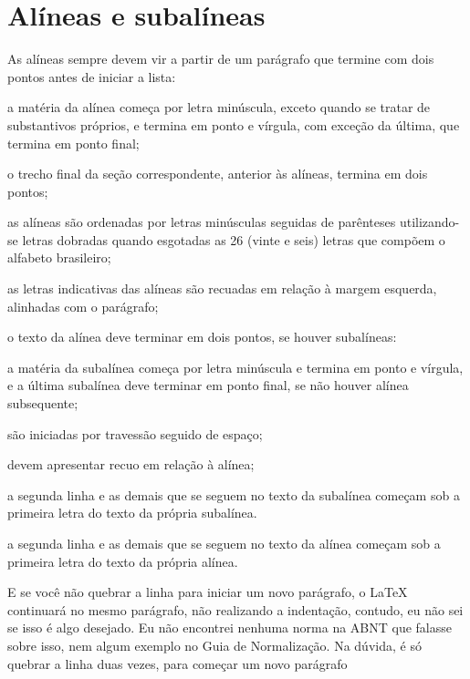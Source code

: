 \section{Alíneas e subalíneas}
  As alíneas sempre devem vir a partir de um parágrafo que termine com dois pontos antes de iniciar a lista:
  \begin{alinea}
    \item a matéria da alínea começa por letra minúscula, exceto quando se tratar de substantivos próprios, e termina em ponto e vírgula, com exceção da última, que termina em ponto final;
    \item o trecho final da seção correspondente, anterior às alíneas, termina em
    dois pontos;
    \item as alíneas são ordenadas por letras minúsculas seguidas de parênteses utilizando-se letras dobradas quando esgotadas as 26 (vinte e seis) letras que compõem o alfabeto brasileiro;\label{alinea:exemplo-ref}
    \item as letras indicativas das alíneas são recuadas em relação à margem
    esquerda, alinhadas com o parágrafo;
    \item o texto da alínea deve terminar em dois pontos, se houver subalíneas: 
    \begin{subalinea}
      \item a matéria da subalínea começa por letra minúscula e termina em ponto e
      vírgula, e a última subalínea deve terminar em ponto final, se não houver
      alínea subsequente; 
      \item são iniciadas por travessão seguido de espaço;
      \item devem apresentar recuo em relação à alínea;
      \item a segunda linha e as demais que se seguem no texto da subalínea
      começam sob a primeira letra do texto da própria subalínea.
    \end{subalinea}
    \item a segunda linha e as demais que se seguem no texto da alínea começam
    sob a primeira letra do texto da própria alínea.
  \end{alinea}
E se você não quebrar a linha para iniciar um novo parágrafo, o \LaTeX{} continuará no mesmo parágrafo, não realizando a indentação, contudo, eu não sei se isso é algo desejado. Eu não encontrei nenhuma norma na ABNT que falasse sobre isso, nem algum exemplo no Guia de Normalização. Na dúvida, é só quebrar a linha duas vezes, para começar um novo parágrafo

